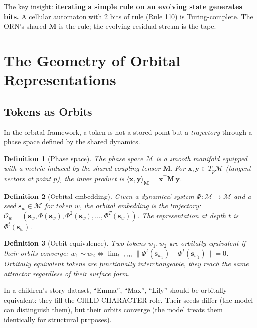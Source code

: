 \documentclass[11pt, a4paper]{article}
\newcommand{\M}{\mathbf{M}}
\newcommand{\x}{\mathbf{x}}
\newcommand{\s}{\mathbf{s}}
\newtheorem{definition}{Definition}
\theoremstyle{remark}
\begin{document}
The key insight: \textbf{iterating a simple rule on an evolving state generates bits.}
A cellular automaton with 2 bits of rule (Rule 110) is Turing-complete.
The ORN's shared $\M$ is the rule; the evolving residual stream is the tape.


\section{The Geometry of Orbital Representations}
\label{sec:geometry}

\subsection{Tokens as Orbits}

In the orbital framework, a token is not a stored point but a \emph{trajectory} through a phase space defined by the shared dynamics.

\begin{definition}[Phase space]
The phase space $\mathcal{M}$ is a smooth manifold equipped with a metric induced by the shared coupling tensor $\M$.
For $\x, \mathbf{y} \in T_p\mathcal{M}$ (tangent vectors at point $p$), the inner product is $\langle \x, \mathbf{y} \rangle_\M = \x^\top \M \, \mathbf{y}$.
\end{definition}

\begin{definition}[Orbital embedding]
Given a dynamical system $\Phi: \mathcal{M} \to \mathcal{M}$ and a seed $\s_w \in \mathcal{M}$ for token $w$, the orbital embedding is the trajectory:
$\mathcal{O}_w = (\s_w, \Phi(\s_w), \Phi^2(\s_w), \ldots, \Phi^T(\s_w))$.
The representation at depth $t$ is $\Phi^t(\s_w)$.
\end{definition}

\begin{definition}[Orbit equivalence]
Two tokens $w_1, w_2$ are orbitally equivalent if their orbits converge:
$w_1 \sim w_2 \iff \lim_{t \to \infty} \|\Phi^t(\s_{w_1}) - \Phi^t(\s_{w_2})\| = 0$.
Orbitally equivalent tokens are functionally interchangeable, they reach the same attractor regardless of their surface form.
\end{definition}

In a children's story dataset, ``Emma'', ``Max'', ``Lily'' should be orbitally equivalent: they fill the CHILD-CHARACTER role.
Their seeds differ (the model can distinguish them), but their orbits converge (the model treats them identically for structural purposes).
\end{document}

